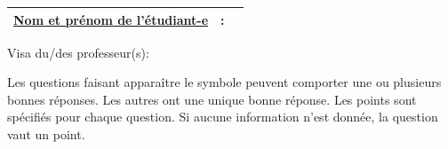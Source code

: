 \documentclass[a4paper]{article}
\begin{document}
\begin{examcopy}[1]
    \vspace*{2cm}

    {\renewcommand{\arraystretch}{0}
    \begin{tabulary}{15cm}{@{}p{6cm}p{0.1cm}@{}p{7.4cm}}
    \hline
    \vspace{15pt}\underline{Nom et prénom de l'étudiant-e} & \vspace{18pt}: & \champnom{{\begin{minipage}[t][1.5cm][c]{8.3cm}\hfill{}\end{minipage}}} \\ \hline
    \end{tabulary}
    }


    \vspace*{4cm}Visa du/des professeur(s): \dotfill


    \vfill
    \newpage

    {
    \em\setlength{\parindent}{0pt}

    Les questions faisant apparaître le symbole \multiSymbole{} peuvent
      comporter une ou plusieurs bonnes réponses. Les autres ont
      une unique bonne réponse. Les points sont spécifiés pour chaque question. Si aucune information n'est donnée, la question vaut un point.

    }\hspace*{\fill}
    \vspace{1ex}



    
  \end{examcopy}
\end{document}
